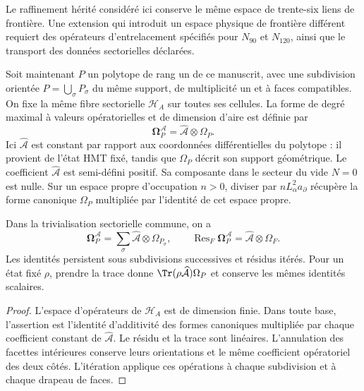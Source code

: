 Le raffinement hérité considéré ici conserve le même espace
de trente-six liens de frontière. Une extension qui introduit
un espace physique de frontière différent requiert des opérateurs d’entrelacement
spécifiés pour \(N_{90}\) et \(N_{120}\), ainsi que le
transport des données sectorielles déclarées.

Soit maintenant \(P\) un polytope de rang un de ce manuscrit, avec une subdivision orientée \(P=\bigcup_\sigma P_\sigma\) du même support, de multiplicité un et à faces compatibles. On fixe la même fibre sectorielle \(\mathscr H_A\) sur toutes ses cellules. La forme de degré maximal à valeurs opératorielles et de dimension d'aire est définie par
\[
 \boldsymbol\Omega^{\mathcal A}_P
 =\widehat{\mathcal A}\otimes\Omega_P.
\]
Ici \(\widehat{\mathcal A}\) est constant par rapport aux
coordonnées différentielles du polytope : il provient de l’état HMT
fixé, tandis que \(\Omega_P\) décrit son support géométrique.
Le coefficient \(\widehat{\mathcal A}\) est semi-défini positif.
Sa composante dans le secteur du vide \(N=0\) est nulle. Sur un
espace propre d’occupation \(n>0\), diviser par
\(nL_\alpha^2a_\partial\) récupère la forme canonique
\(\Omega_P\) multipliée par l’identité de cet espace propre.

\begin{proposition}
\label{rev5:forma-areal}
Dans la trivialisation sectorielle commune, on a
\begin{equation}
 \boldsymbol\Omega^{\mathcal A}_P
 =\sum_\sigma\widehat{\mathcal A}\otimes\Omega_{P_\sigma},
 \qquad
 \operatorname{Res}_F\boldsymbol\Omega^{\mathcal A}_P
 =\widehat{\mathcal A}\otimes\Omega_F.
\end{equation}
Les identités persistent sous subdivisions successives et résidus itérés. Pour un état fixé \(\rho\), prendre la trace donne \(\Tr(\rho\widehat{\mathcal A})\Omega_P\) et conserve les mêmes identités scalaires.
\end{proposition}
\begin{proof}
L’espace d’opérateurs de \(\mathscr H_A\) est de dimension
finie. Dans toute base, l’assertion est l’identité
d’additivité des formes canoniques multipliée par chaque coefficient
constant de \(\widehat{\mathcal A}\). Le résidu et la trace
sont linéaires. L’annulation des facettes intérieures conserve leurs
orientations et le même coefficient opératoriel des deux côtés.
L’itération applique ces opérations à chaque subdivision et à chaque
drapeau de faces.
\end{proof}

